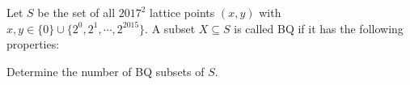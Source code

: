 Let $S$ be the set of all $2017^2$ lattice points $(x,y)$ with $x,y\in \{0\}\cup\{2^{0},2^{1},\cdots,2^{2015}\}$. A subset $X\subseteq S$ is called BQ if it has the following properties:

\begin{enumerate}





\end{enumerate}

Determine the number of BQ subsets of $S$.
